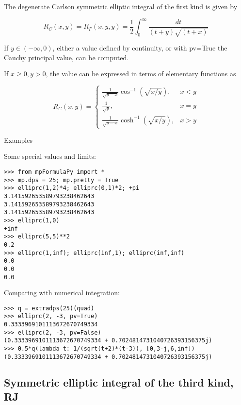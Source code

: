 \vpara
The degenerate Carlson symmetric elliptic integral of the first kind is given by

\begin{equation}
R_C(x,y) = R_F(x,y,y)=\frac{1}{2} \int_0^{\infty} \frac{dt}{(t+y)\sqrt{(t+x)}}
\end{equation}

If $y \in (-\infty, 0)$, either a value defined by continuity, or with pv=True the Cauchy principal value, can be computed.

If $x \geq 0, y > 0$, the value can be expressed in terms of elementary functions as

\begin{equation}
  R_C(x,y)=\begin{cases}
    \frac{1}{\sqrt{y-x}} \cos^{-1}\left(\sqrt{x/y}\right), & x<y \\
    \frac{1}{\sqrt{y}}, & x=y \\
		\frac{1}{\sqrt{y-x}} \cosh^{-1}\left(\sqrt{x/y}\right), & x>y 
  \end{cases}
\end{equation}


Examples

Some special values and limits:


\begin{lstlisting}
>>> from mpFormulaPy import *
>>> mp.dps = 25; mp.pretty = True
>>> elliprc(1,2)*4; elliprc(0,1)*2; +pi
3.141592653589793238462643
3.141592653589793238462643
3.141592653589793238462643
>>> elliprc(1,0)
+inf
>>> elliprc(5,5)**2
0.2
>>> elliprc(1,inf); elliprc(inf,1); elliprc(inf,inf)
0.0
0.0
0.0
\end{lstlisting}

Comparing with numerical integration:

\begin{lstlisting}
>>> q = extradps(25)(quad)
>>> elliprc(2, -3, pv=True)
0.3333969101113672670749334
>>> elliprc(2, -3, pv=False)
(0.3333969101113672670749334 + 0.7024814731040726393156375j)
>>> 0.5*q(lambda t: 1/(sqrt(t+2)*(t-3)), [0,3-j,6,inf])
(0.3333969101113672670749334 + 0.7024814731040726393156375j)
\end{lstlisting}



\subsection{Symmetric elliptic integral of the third kind, RJ}

